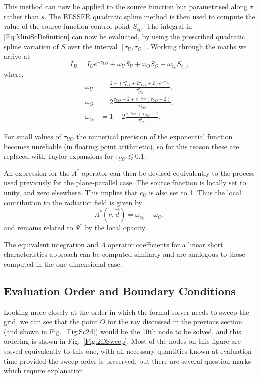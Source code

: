This method can now be applied to the source function but parametrised along $\tau$ rather than $s$.
The BESSER quadratic spline method is then used to compute the value of the source function control point $S_{c_U}$.
The integral in \eqref{Eq:MiniScDefinition} can now be evaluated, by using the prescribed quadratic spline variation of $S$ over the interval $[\tau_{U}, \tau_{O}]$.
Working through the maths we arrive at
\begin{equation}
    I_D = I_Ue^{-\tau_{UO}} + \omega_U S_U + \omega_O S_O + \omega_{c_U} S_{c_U},
\end{equation}
where,
{
\def\edt{e^{-\tau_{UO}}}
\def\tsq{\tau_{UO}^2}
\begin{align}
    \omega_U &= \frac{2 - (\tsq + 2\tau_{UO} + 2)\edt}{\tsq},\\
    \omega_O &= 2\frac{\tau_{UO} - 2 + \edt (\tau_{UO} + 2)}{\tsq},\\
    \omega_{c_U} &= 1 - 2 \frac{\edt + \tau_{UO} - 1}{\tsq}.
\end{align}
}

For small values of $\tau_{UO}$ the numerical precision of the exponential function becomes unreliable (in floating point arithmetic), so for this reason these are replaced with Taylor expansions for $\tau_{UO}\lesssim 0.1$.

An expression for the $\Lambda^*$ operator can then be devised equivalently to the process used previously for the plane-parallel case.
The source function is locally set to unity, and zero elsewhere.
This implies that $c_U$ is also set to 1.
Thus the local contribution to the radiation field is given by
\begin{equation}
    \Lambda^*(\nu, \vec{d}) = \omega_{c_U} + \omega_O,
\end{equation}
and remains related to $\Psi^*$ by the local opacity.

The equivalent integration and $\Lambda$ operator coefficients for a linear short characteristics approach can be computed similarly and are analogous to those computed in the one-dimensional case.

\subsection{Evaluation Order and Boundary Conditions}\label{Sec:2dEvalOrder}

Looking more closely at the order in which the formal solver needs to sweep the grid, we can see that the point $O$ for the ray discussed in the previous section (and shown in Fig.~\ref{Fig:Sc2d}) would be the 10th node to be solved, and this ordering is shown in Fig.~\ref{Fig:2DSweep}.
Most of the nodes on this figure are solved equivalently to this one, with all necessary quantities known at evaluation time provided the sweep order is preserved, but there are several question marks which require explanation.

